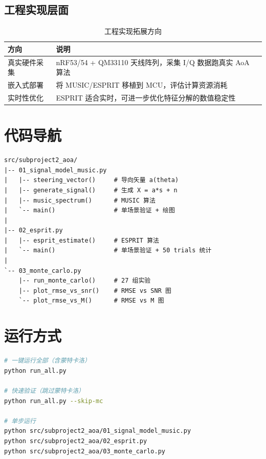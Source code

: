 \documentclass[11pt,a4paper]{article}
\begin{document}
\subsection{工程实现层面}

\begin{table}[H]
\centering
\caption{工程实现拓展方向}
\small
\begin{tabular}{lp{8.5cm}}
\toprule
\textbf{方向} & \textbf{说明} \\
\midrule
真实硬件采集 & nRF53/54 + QM33110 天线阵列，采集 I/Q 数据跑真实 AoA 算法 \\
嵌入式部署 & 将 MUSIC/ESPRIT 移植到 MCU，评估计算资源消耗 \\
实时性优化 & ESPRIT 适合实时，可进一步优化特征分解的数值稳定性 \\
\bottomrule
\end{tabular}
\end{table}

\section{代码导航}

\begin{verbatim}
src/subproject2_aoa/
|-- 01_signal_model_music.py
|   |-- steering_vector()     # 导向矢量 a(theta)
|   |-- generate_signal()     # 生成 X = a*s + n
|   |-- music_spectrum()      # MUSIC 算法
|   `-- main()                # 单场景验证 + 绘图
|
|-- 02_esprit.py
|   |-- esprit_estimate()     # ESPRIT 算法
|   `-- main()                # 单场景验证 + 50 trials 统计
|
`-- 03_monte_carlo.py
    |-- run_monte_carlo()     # 27 组实验
    |-- plot_rmse_vs_snr()    # RMSE vs SNR 图
    `-- plot_rmse_vs_M()      # RMSE vs M 图
\end{verbatim}

\section{运行方式}

\begin{lstlisting}[language=bash, caption={一键运行}]
# 一键运行全部（含蒙特卡洛）
python run_all.py

# 快速验证（跳过蒙特卡洛）
python run_all.py --skip-mc

# 单步运行
python src/subproject2_aoa/01_signal_model_music.py
python src/subproject2_aoa/02_esprit.py
python src/subproject2_aoa/03_monte_carlo.py
\end{lstlisting}
\end{document}
